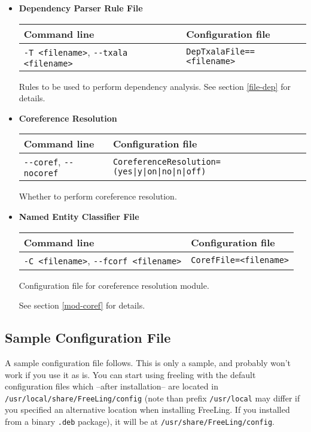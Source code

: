 \documentclass[a4paper]{book}
\begin{document}
\begin{itemize}
\item {\bf Dependency Parser Rule File}

\begin{tabular}{|l|l|}
Command line       & Configuration file   \\ \hline
\verb#-T <filename>#, \verb#--txala <filename>#   & \verb#DepTxalaFile==<filename>#  \\ \hline
\end{tabular}

  Rules to be used to perform dependency analysis.
  See section \ref{file-dep} for details.

\item {\bf Coreference Resolution}

\begin{tabular}{|l|l|}
Command line       & Configuration file   \\ \hline
\verb#--coref#, \verb#--nocoref#     & \verb#CoreferenceResolution=(yes|y|on|no|n|off)#    \\ \hline
\end{tabular}

   Whether to perform coreference resolution.


\item {\bf Named Entity Classifier File}

\begin{tabular}{|l|l|}
Command line       & Configuration file   \\ \hline
\verb#-C <filename>#, \verb#--fcorf <filename>#   & \verb#CorefFile=<filename>#  \\ \hline
\end{tabular}

  Configuration file for coreference resolution module.

  See section \ref{mod-coref} for details.

\end{itemize}


\newpage


\subsection{Sample Configuration File}
\label{ss-config}

  A sample configuration file follows.  This is only a sample, and
  probably won't work if you use it as is.  You can start using
  freeling with the default configuration files which --after
  installation-- are located in {\tt /usr/local/share/FreeLing/config}
  (note than prefix {\tt /usr/local} may differ if you specified an
  alternative location when installing FreeLing. If you
  installed from a binary {\tt .deb} package), it will be 
  at {\tt /usr/share/FreeLing/config}.
\end{document}
